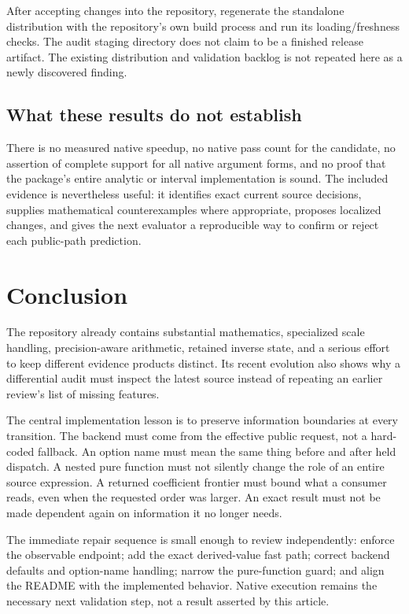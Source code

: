 \documentclass[11pt,letterpaper]{article}
\begin{document}
After accepting changes into the repository, regenerate the standalone distribution with the repository's own build process and run its loading/freshness checks. The audit staging directory does not claim to be a finished release artifact. The existing distribution and validation backlog is not repeated here as a newly discovered finding.

\subsection{What these results do not establish}

There is no measured native speedup, no native pass count for the candidate, no assertion of complete support for all native argument forms, and no proof that the package's entire analytic or interval implementation is sound. The included evidence is nevertheless useful: it identifies exact current source decisions, supplies mathematical counterexamples where appropriate, proposes localized changes, and gives the next evaluator a reproducible way to confirm or reject each public-path prediction.

\section{Conclusion}

The repository already contains substantial mathematics, specialized scale handling, precision-aware arithmetic, retained inverse state, and a serious effort to keep different evidence products distinct. Its recent evolution also shows why a differential audit must inspect the latest source instead of repeating an earlier review's list of missing features.

The central implementation lesson is to preserve information boundaries at every transition. The backend must come from the effective public request, not a hard-coded fallback. An option name must mean the same thing before and after held dispatch. A nested pure function must not silently change the role of an entire source expression. A returned coefficient frontier must bound what a consumer reads, even when the requested order was larger. An exact result must not be made dependent again on information it no longer needs.

The immediate repair sequence is small enough to review independently: enforce the observable endpoint; add the exact derived-value fast path; correct backend defaults and option-name handling; narrow the pure-function guard; and align the README with the implemented behavior. Native execution remains the necessary next validation step, not a result asserted by this article.
\end{document}
